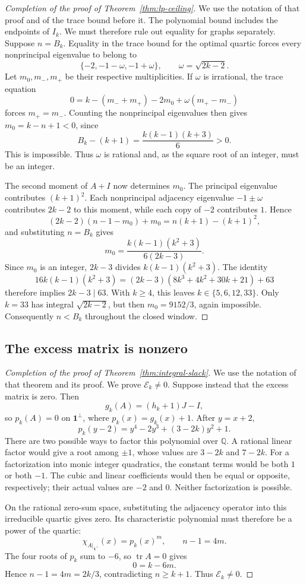 \documentclass[a4paper,10pt,reqno]{amsart}
\theoremstyle{plain}
\theoremstyle{definition}
\theoremstyle{remark}
\newcommand{\one}{\mathbf 1}
\newcommand{\tr}{\operatorname{tr}}
\begin{document}
\begin{proof}[Completion of the proof of Theorem~\ref{thm:lp-ceiling}]
We use the notation of that proof and of the trace bound before it.
The polynomial bound includes the endpoints of \(I_k\).
We must therefore rule out equality for graphs separately. Suppose \(n=B_k\).
Equality in the trace bound for the optimal quartic forces every
nonprincipal eigenvalue to belong to
\[
 \{-2,-1-\omega,-1+\omega\},\qquad \omega=\sqrt{2k-2}.
\]
Let \(m_0,m_-,m_+\) be their respective multiplicities.  If
\(\omega\) is irrational, the trace equation
\[
 0=k-(m_-+m_+)-2m_0+\omega(m_+-m_-)
\]
forces \(m_+=m_-\).  Counting the nonprincipal eigenvalues then gives
\(m_0=k-n+1<0\), since
\[
 B_k-(k+1)=\frac{k(k-1)(k+3)}6>0.
\]
This is impossible.  Thus \(\omega\) is rational and, as the square root
of an integer, must be an integer.

The second moment of \(A+I\) now determines \(m_0\).  The principal
eigenvalue contributes \((k+1)^2\).  Each nonprincipal adjacency
eigenvalue \(-1\pm\omega\) contributes \(2k-2\) to this moment,
while each copy of \(-2\) contributes \(1\).  Hence
\[
 (2k-2)(n-1-m_0)+m_0=n(k+1)-(k+1)^2,
\]
and substituting \(n=B_k\) gives
\[
 m_0=\frac{k(k-1)(k^2+3)}{6(2k-3)}.
\]
Since \(m_0\) is an integer, \(2k-3\) divides
\(k(k-1)(k^2+3)\).  The identity
\[
 16k(k-1)(k^2+3)
 =(2k-3)(8k^3+4k^2+30k+21)+63
\]
therefore implies \(2k-3\mid63\).  With \(k\ge4\), this leaves
\(k\in\{5,6,12,33\}\).  Only \(k=33\) has integral
\(\sqrt{2k-2}\), but then \(m_0=9152/3\), again impossible.
Consequently \(n<B_k\) throughout the closed window.
\end{proof}

\subsection{The excess matrix is nonzero}

\begin{proof}[Completion of the proof of Theorem~\ref{thm:integral-slack}]
We use the notation of that theorem and its proof.
We prove \(\mathcal E_k\ne0\). Suppose instead that the excess
matrix is zero. Then
\[
 g_k(A)=(h_k+1)J-I,
\]
so \(p_k(A)=0\) on \(\one^\perp\), where \(p_k(x)=g_k(x)+1\).  After
\(y=x+2\),
\[
 p_k(y-2)=y^4-2y^3+(3-2k)y^2+1.
\]
There are two possible ways to factor this polynomial over \(\mathbb Q\).
A rational linear factor would give a root among \(\pm1\), whose values are
\(3-2k\) and \(7-2k\).  For a factorization into monic integer quadratics,
the constant terms would be both \(1\) or both \(-1\).  The cubic and
linear coefficients would then be equal or opposite, respectively; their
actual values are \(-2\) and \(0\).  Neither factorization is possible.

On the rational zero-sum space, substituting the adjacency operator into
this irreducible quartic gives zero. Its characteristic polynomial must
therefore be a power of the quartic:
\[
 \chi_{A|_{\one^\perp}}(x)=p_k(x)^m,\qquad n-1=4m.
\]
The four roots of \(p_k\) sum to \(-6\), so \(\tr A=0\) gives
\[
 0=k-6m.
\]
Hence \(n-1=4m=2k/3\), contradicting \(n\ge k+1\).  Thus
\(\mathcal E_k\ne0\).
\end{proof}
\end{document}
